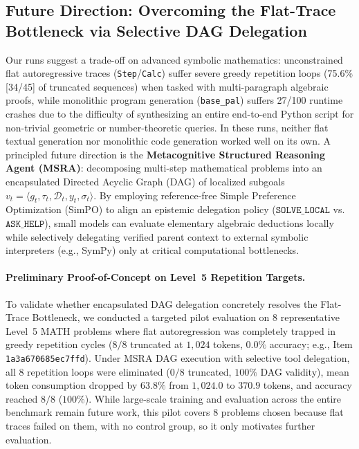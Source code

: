 \documentclass[11pt,a4paper]{article}
\begin{document}
\subsection{Future Direction: Overcoming the Flat-Trace Bottleneck via Selective DAG Delegation}
Our runs suggest a trade-off on advanced symbolic mathematics: unconstrained flat autoregressive traces (\texttt{Step}/\texttt{Calc}) suffer severe greedy repetition loops (75.6\% [34/45] of truncated sequences) when tasked with multi-paragraph algebraic proofs, while monolithic program generation (\texttt{base\_pal}) suffers 27/100 runtime crashes due to the difficulty of synthesizing an entire end-to-end Python script for non-trivial geometric or number-theoretic queries. In these runs, neither flat textual generation nor monolithic code generation worked well on its own. A principled future direction is the \textbf{Metacognitive Structured Reasoning Agent (MSRA)}: decomposing multi-step mathematical problems into an encapsulated Directed Acyclic Graph (DAG) of localized subgoals $v_t = \langle g_t, \tau_t, \mathcal{D}_t, y_t, \sigma_t \rangle$. By employing reference-free Simple Preference Optimization (SimPO) \citep{meng2024simpo} to align an epistemic delegation policy ($\texttt{SOLVE\_LOCAL}$ vs. $\texttt{ASK\_HELP}$), small models can evaluate elementary algebraic deductions locally while selectively delegating verified parent context to external symbolic interpreters (e.g., SymPy) only at critical computational bottlenecks.

\paragraph{Preliminary Proof-of-Concept on Level~5 Repetition Targets.}
To validate whether encapsulated DAG delegation concretely resolves the Flat-Trace Bottleneck, we conducted a targeted pilot evaluation on 8 representative Level~5 MATH problems where flat autoregression was completely trapped in greedy repetition cycles ($8/8$ truncated at $1{,}024$ tokens, $0.0\%$ accuracy; e.g., Item \texttt{1a3a670685ec7ffd}). Under MSRA DAG execution with selective tool delegation, all 8 repetition loops were eliminated ($0/8$ truncated, $100\%$ DAG validity), mean token consumption dropped by $63.8\%$ from $1{,}024.0$ to $370.9$ tokens, and accuracy reached $8/8$ ($100\%$). While large-scale training and evaluation across the entire benchmark remain future work, this pilot covers 8 problems chosen because flat traces failed on them, with no control group, so it only motivates further evaluation.
\end{document}
